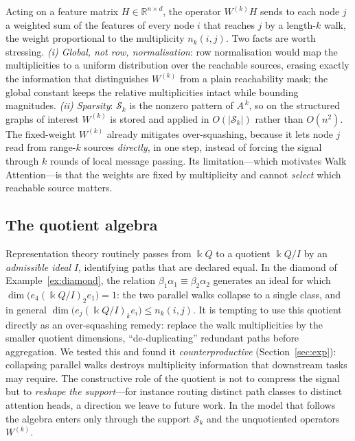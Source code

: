 \documentclass[runningheads]{llncs}
\newcommand{\kk}{\Bbbk}
\newcommand{\kQ}{\kk Q}
\newcommand{\RR}{\mathbb{R}}
\newcommand{\Adj}{A}
\begin{document}
Acting on a feature matrix $H\in\RR^{n\times d}$, the operator $W^{(k)}H$ sends
to each node $j$ a weighted sum of the features of every node $i$ that reaches
$j$ by a length-$k$ walk, the weight proportional to the multiplicity
$n_k(i,j)$. Two facts are worth stressing. \emph{(i) Global, not row,
normalisation}: row normalisation would map the multiplicities to a uniform
distribution over the reachable sources, erasing exactly the information that
distinguishes $W^{(k)}$ from a plain reachability mask; the global constant
keeps the relative multiplicities intact while bounding magnitudes.
\emph{(ii) Sparsity}: $\mathcal{S}_k$ is the nonzero pattern of $\Adj^{\,k}$,
so on the structured graphs of interest $W^{(k)}$ is stored and applied in
$O(|\mathcal{S}_k|)$ rather than $O(n^2)$. The fixed-weight $W^{(k)}$ already
mitigates over-squashing, because it lets node $j$ read from range-$k$ sources
\emph{directly}, in one step, instead of forcing the signal through $k$ rounds
of local message passing. Its limitation---which motivates Walk Attention---is
that the weights are fixed by multiplicity and cannot \emph{select} which
reachable source matters.

\subsection{The quotient algebra}

Representation theory routinely passes from $\kQ$ to a quotient $\kQ/I$ by an
\emph{admissible ideal} $I$, identifying paths that are declared equal. In the
diamond of Example~\ref{ex:diamond}, the relation
$\beta_1\alpha_1\equiv\beta_2\alpha_2$ generates an ideal for which
$\dim\bigl(e_4(\kQ/I)_2e_1\bigr)=1$: the two parallel walks collapse to a
single class, and in general
$\dim\bigl(e_j(\kQ/I)_ke_i\bigr)\le n_k(i,j)$. It is tempting to use this
quotient directly as an over-squashing remedy: replace the walk multiplicities
by the smaller quotient dimensions, ``de-duplicating'' redundant paths before
aggregation. We tested this and found it \emph{counterproductive}
(Section~\ref{sec:exp}): collapsing parallel walks destroys multiplicity
information that downstream tasks may require. The constructive role of the
quotient is not to compress the signal but to \emph{reshape the support}---for
instance routing distinct path classes to distinct attention heads, a direction
we leave to future work. In the model that follows the algebra enters only
through the support $\mathcal{S}_k$ and the unquotiented operators $W^{(k)}$.
\end{document}
